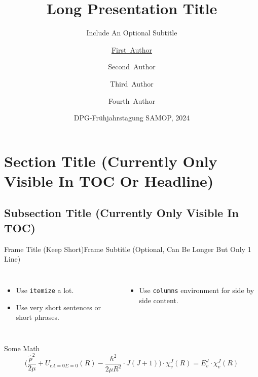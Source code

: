 \documentclass[aspectratio=1610]{beamer}
\title[Short Title]%
{Long Presentation Title}
\subtitle
{Include An Optional Subtitle}
\author[F.~Author] %
{\underline{First~Author}\inst{1} \and Second~Author\inst{1} \and Third~Author\inst{2} \and Fourth~Author\inst{2}}
\institute[Uni Kassel] %
{
  \inst{1}%
  Institute of Physics and CINSaT\\
  University of Kassel
  \and
  \inst{2}%
  Department of Something\\
  University of Somewhere}
\date[DPG 2024] %
{DPG-Frühjahrstagung SAMOP, 2024}
\begin{document}
\begin{frame}
  \titlepage
\end{frame}






\section{Section Title (Currently Only Visible In TOC Or Headline)}

\subsection{Subsection Title (Currently Only Visible In TOC)}

\begin{frame}{Frame Title (Keep Short)}{Frame Subtitle (Optional, Can Be Longer But Only 1 Line)}
  \begin{columns}
    \begin{itemize}
      \item Use \texttt{itemize} a lot.
      \item Use very short sentences or short phrases.
    \end{itemize}
    \begin{itemize}
      \item Use \texttt{columns} environment for side by side content.
    \end{itemize}
  \end{columns}
  \begin{block}{Some Math}
    \begin{equation}
      \biggl(\frac{\hat{p}^2}{2 \mu} + U_{e \Lambda=0 \Sigma=0}\left(R\right) - \frac{\hbar^2}{2 \mu R^2} \cdot J \left(J + 1\right) \biggr) \cdot \chi^J_v\left(R\right) = E^J_v \cdot \chi^J_v\left(R\right)
    \end{equation}
  \end{block}
\end{frame}
\end{document}
